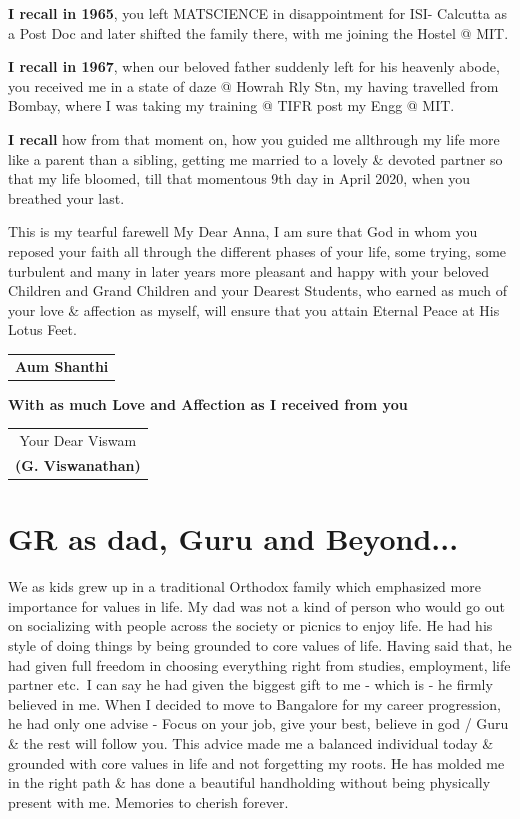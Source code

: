 \textbf{I recall in 1965}, you left MATSCIENCE in disappointment for ISI- Calcutta as a Post Doc and later shifted the family there, with me joining the Hostel @ MIT.

\textbf{I recall in 1967}, when our beloved father suddenly left for his heavenly abode, you received me in a state of daze @ Howrah Rly Stn, my having travelled from Bombay, where I was taking my training @ TIFR post my Engg @ MIT.

\textbf{I recall} how from that moment on, how you guided me all\break through my life more like a parent than a sibling, getting me married to a lovely \& devoted partner so that my life bloomed, till that momentous 9th day in April 2020, when you breathed your last.

This is my tearful farewell My Dear Anna, I am sure that God in whom you reposed your faith all through the different phases of your life, some trying, some turbulent and many in later years more pleasant and happy with your beloved Children and Grand Children and your Dearest Students, who earned as much of your love \& affection as myself, will ensure that you attain Eternal Peace at His Lotus Feet.
\bigskip


\begin{flushright}
\begin{tabular}{c}
\textbf{Aum Shanthi}
\end{tabular}
\end{flushright}
\bigskip

\noindent 
\textbf{With as much Love and Affection as I received from you}
\bigskip

\begin{flushright}
\begin{tabular}{c}
Your Dear Viswam\\
\textbf{(G. Viswanathan)}
\end{tabular}
\end{flushright}
\bigskip

\section*{GR as dad, Guru and Beyond...}

We as kids grew up in a traditional Orthodox family which emphasized more importance for values in life. My dad was not a kind of person who would go out on socializing with people across the society or picnics to enjoy life. He had his style of doing things by being grounded to core values of life. Having said that, he had given full freedom in choosing everything right from studies, employment, life partner etc.\ I can say he had given the biggest gift to me - which is - he firmly believed in me. When I decided to move to Bangalore for my career progression, he had only one advise - Focus on your job, give your best, believe in god / Guru \& the rest will follow you. This advice made me a balanced individual today \& grounded with core values in life and not forgetting my roots. He has molded me in the right path \& has done a beautiful handholding without being physically present with me. Memories to cherish forever.
\bigskip

